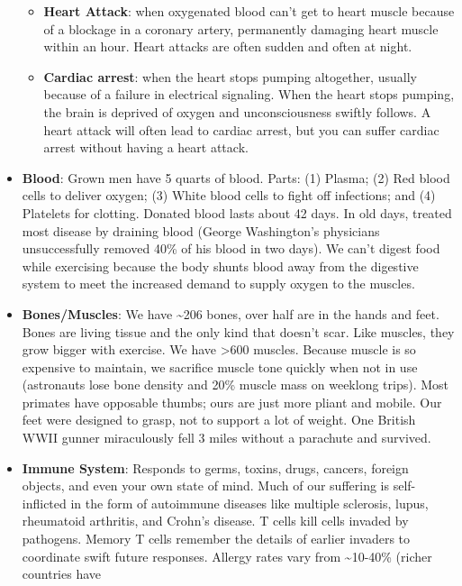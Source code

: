 \documentclass[
]{article}
\begin{document}
\begin{itemize}
  \begin{itemize}
  \item
    \textbf{Heart Attack}: when oxygenated blood can't get to heart
    muscle because of a blockage in a coronary artery, permanently
    damaging heart muscle within an hour. Heart attacks are often sudden
    and often at night.
  \item
    \textbf{Cardiac arrest}: when the heart stops pumping altogether,
    usually because of a failure in electrical signaling. When the heart
    stops pumping, the brain is deprived of oxygen and unconsciousness
    swiftly follows. A heart attack will often lead to cardiac arrest,
    but you can suffer cardiac arrest without having a heart attack.
  \end{itemize}
\item
  \textbf{Blood}: Grown men have 5 quarts of blood. Parts: (1) Plasma;
  (2) Red blood cells to deliver oxygen; (3) White blood cells to fight
  off infections; and (4) Platelets for clotting. Donated blood lasts
  about 42 days. In old days, treated most disease by draining blood
  (George Washington's physicians unsuccessfully removed 40\% of his
  blood in two days). We can't digest food while exercising because the
  body shunts blood away from the digestive system to meet the increased
  demand to supply oxygen to the muscles.
\item
  \textbf{Bones/Muscles}: We have \textasciitilde206 bones, over half
  are in the hands and feet. Bones are living tissue and the only kind
  that doesn't scar. Like muscles, they grow bigger with exercise. We
  have \textgreater600 muscles. Because muscle is so expensive to
  maintain, we sacrifice muscle tone quickly when not in use (astronauts
  lose bone density and 20\% muscle mass on weeklong trips). Most
  primates have opposable thumbs; ours are just more pliant and mobile.
  Our feet were designed to grasp, not to support a lot of weight. One
  British WWII gunner miraculously fell 3 miles without a parachute and
  survived.
\item
  \textbf{Immune System}: Responds to germs, toxins, drugs, cancers,
  foreign objects, and even your own state of mind. Much of our
  suffering is self-inflicted in the form of autoimmune diseases like
  multiple sclerosis, lupus, rheumatoid arthritis, and Crohn's disease.
  T cells kill cells invaded by pathogens. Memory T cells remember the
  details of earlier invaders to coordinate swift future responses.
  Allergy rates vary from \textasciitilde10-40\% (richer countries have

\end{itemize}
\end{document}
